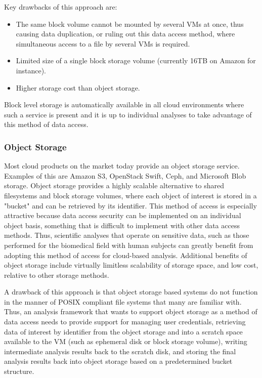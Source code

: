 Key drawbacks of this approach are:

\begin{itemize}
\item The same block volume cannot be mounted by several VMs at once, thus causing data duplication, or ruling out this data access method, where simultaneous access to a file by several VMs is required.
\item Limited size of a single block storage volume (currently 16TB on Amazon for instance).
\item Higher storage cost than object storage.
\end{itemize}

Block level storage is automatically available in all cloud environments where such a service is present and it is up to individual analyses to take advantage of this method of data access. 

\subsubsection{Object Storage}

Most cloud products on the market today provide an object storage service. Examples of this are Amazon S3, OpenStack Swift, Ceph\autocite{weil2006ceph}, and Microsoft Blob storage.  Object storage provides a highly scalable alternative to shared filesystems and block storage volumes, where each object of interest is stored in a "bucket" and can be retrieved by its identifier.  This method of access is especially attractive because data access security can be implemented on an individual object basis, something that is difficult to implement with other data access methods. Thus, scientific analyses that operate on sensitive data, such as those performed for the biomedical field with human subjects can greatly benefit from adopting this method of access for cloud-based analysis. Additional benefits of object storage include virtually limitless scalability of storage space, and low cost, relative to other storage methods.  

A drawback of this approach is that object storage based systems do not function in the manner of POSIX compliant file systems that many are familiar with. Thus, an analysis framework that wants to support object storage as a method of data access needs to provide support for managing user credentials, retrieving data of interest by identifier from the object storage and into a scratch space available to the VM (such as ephemeral disk or block storage volume), writing intermediate analysis results back to the scratch disk, and storing the final analysis results back into object storage based on a predetermined bucket structure.

